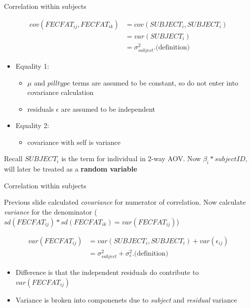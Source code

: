 \documentclass[
  ignorenonframetext,
]{beamer}
\providecommand{\tightlist}{%
  \setlength{\itemsep}{0pt}\setlength{\parskip}{0pt}}
\begin{document}
\begin{frame}{Correlation within subjects}
\protect\hypertarget{correlation-within-subjects}{}

\begin{equation*}
\begin{aligned}
cov(FECFAT_{ij}, FECFAT_{ik}) &= cov(SUBJECT_i, SUBJECT_i) \\
                              &= var(SUBJECT_i) \\
                              &= \sigma_{subject}^2. \textrm{(definition)}
\end{aligned}
\end{equation*}

\begin{itemize}
\tightlist
\item
  Equality 1:

  \begin{itemize}
  \tightlist
  \item
    \(\mu\) and \(pilltype\) terms are assumed to be constant, so do not
    enter into covariance calculation
  \item
    residuals \(\epsilon\) are assumed to be independent
  \end{itemize}
\item
  Equality 2:

  \begin{itemize}
  \tightlist
  \item
    covariance with self is variance
  \end{itemize}
\end{itemize}

Recall \(SUBJECT_i\) is the term for individual in 2-way AOV. Now
\(\beta_i * subjectID\), will later be treated as a \textbf{random
variable}

\end{frame}

\begin{frame}{Correlation within subjects}
\protect\hypertarget{correlation-within-subjects-1}{}

Previous slide calculated \emph{covariance} for numerator of
correlation. Now calculate \emph{variance} for the denominator
(\({sd(FECFAT_{ij}) * sd(FECFAT_{ik})} = var(FECFAT_{ij})\))

\begin{equation*}
\begin{aligned}
var(FECFAT_{ij}) &= var(SUBJECT_i, SUBJECT_i) + var(\epsilon_{ij}) \\
                              &= \sigma_{subject}^2 + \sigma_{\epsilon}^2. \textrm{(definition)}
\end{aligned}
\end{equation*}

\begin{itemize}
\tightlist
\item
  Difference is that the independent residuals do contribute to
  \(var(FECFAT_{ij})\)
\item
  Variance is broken into componenets due to \emph{subject} and
  \emph{residual} variance
\end{itemize}

\end{frame}
\end{document}
